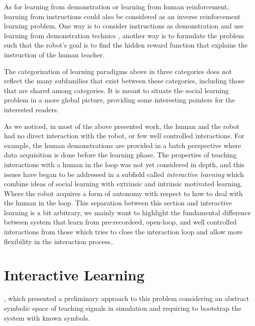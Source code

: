 As for learning from demonstration or learning from human reinforcement, learning from instructions could also be considered as an inverse reinforcement learning problem. One way is to consider instructions as demonstration and use learning from demonstration technics , another way is to formulate the problem such that the robot's goal is to find the hidden reward function that explains the instruction of the human teacher.

\transition

The categorization of learning paradigms above in three categories does not reflect the many subfamilies that exist between these categories, including those that are shared among categories. It is meant to situate the social learning problem in a more global picture, providing some interesting pointers for the interested readers. 

As we noticed, in most of the above presented work, the human and the robot had no direct interaction with the robot, or few well controlled interactions. For example, the human demonstrations are provided in a batch perspective where data acquisition is done
before the learning phase. The properties of teaching interactions with a human in the loop was not yet considered in depth, and this issues have began to be addressed in a subfield called \emph{interactive learning}  which combine ideas of social learning with extrinsic and intrinsic motivated learning. Where the robot acquires a form of autonomy with respect to how to deal with the human in the loop. This separation between this section and interactive learning is a bit arbitrary, we mainly want to highlight the fundamental difference between system that learn from pre-recordeed, open-loop, and  well controlled interactions from those which tries to close the interaction loop and allow more flexibility in the interaction process..

\section{Interactive Learning}

\cite{macl11simul}, which presented a preliminary approach to this problem considering an abstract symbolic space of teaching signals in simulation and requiring to bootstrap the system with known symbols. 

